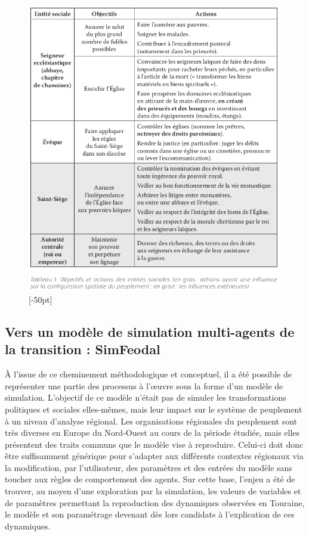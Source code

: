 \begin{figure}[H]
\centering
\includegraphics[width=1\linewidth]{src/Chapitre_TMD/Tab1_2.png}
[-50pt]
\end{figure}

\subsection{Vers un modèle de simulation multi-agents de la transition : SimFeodal}

À l'issue de ce cheminement méthodologique et conceptuel, il a été possible de représenter une partie des processus à l'œuvre sous la forme d'un modèle de simulation.
L'objectif de ce modèle n'était pas de simuler les transformations politiques et sociales elles-mêmes, mais leur impact sur le système	de peuplement à un niveau d'analyse régional.
Les organisations régionales du peuplement sont très diverses en Europe du Nord-Ouest au cours de la période étudiée, mais elles présentent des traits communs que le modèle vise à reproduire.
Celui-ci doit donc être suffisamment générique pour s'adapter aux différents contextes régionaux via la modification, par l'utilisateur, des paramètres et des entrées du modèle sans toucher aux règles de comportement des agents.
Sur cette base, l'enjeu a été de trouver, au moyen d'une exploration par la simulation, les valeurs de variables et de paramètres permettant la reproduction des dynamiques observées en Touraine, le modèle et son paramétrage	devenant dès lors candidats à l'explication de ces dynamiques.


